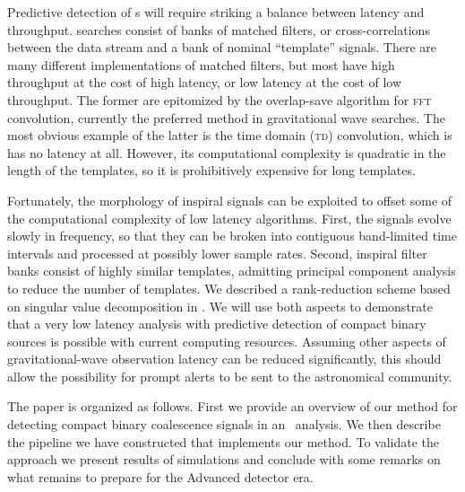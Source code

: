 Predictive detection of \CBC{}s will require striking a balance between latency
and throughput.  \CBC{} searches consist of banks of matched filters, or
cross-correlations between the data stream and a bank of nominal ``template''
signals.  There are many different implementations of matched filters, but most
have high throughput at the cost of high latency, or low latency at the cost of
low throughput.  The former are epitomized by the overlap-save algorithm for
\textsc{fft} convolution, currently the preferred method in gravitational wave
searches.  The most obvious example of the latter is the time domain
(\textsc{td}) convolution, which is has no latency at all.  However, its
computational complexity is quadratic in the length of the templates, so it is
prohibitively expensive for long templates.

Fortunately, the morphology of inspiral signals can be exploited to offset some
of the computational complexity of low latency algorithms.  First, the signals
evolve slowly in frequency, so that they can be broken into contiguous
band-limited time intervals and processed at possibly lower sample rates.
Second, inspiral filter banks consist of highly similar templates, admitting
principal component analysis to reduce the number of templates.  We described a
rank-reduction scheme based on singular value decomposition in
\cite{Cannon:2010p10398}.  We will use both aspects to demonstrate that a very
low latency analysis with predictive detection of compact binary sources is
possible with current computing resources.  Assuming other aspects of
gravitational-wave observation latency can be reduced significantly, this
should allow the possibility for prompt alerts to be sent to the astronomical
community.

The paper is organized as follows. First we provide an overview of our method
for detecting compact binary coalescence signals in an \earlywarning\ analysis.
We then describe the pipeline we have constructed that implements our method.
To validate the approach we present results of simulations and conclude with
some remarks on what remains to prepare for the Advanced detector era.

